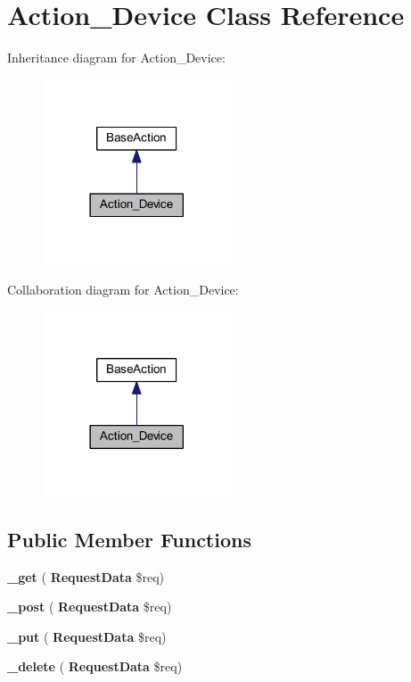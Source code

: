 \section{Action\+\_\+\+Device Class Reference}
\label{class_lora_1_1_api_1_1_action___device}


Inheritance diagram for Action\+\_\+\+Device\+:\nopagebreak
\begin{figure}[H]
\begin{center}
\leavevmode
\includegraphics[width=158pt]{class_lora_1_1_api_1_1_action___device__inherit__graph}
\end{center}
\end{figure}


Collaboration diagram for Action\+\_\+\+Device\+:\nopagebreak
\begin{figure}[H]
\begin{center}
\leavevmode
\includegraphics[width=158pt]{class_lora_1_1_api_1_1_action___device__coll__graph}
\end{center}
\end{figure}
\subsection*{Public Member Functions}
\begin{DoxyCompactItemize}
\item 
\mbox{\label{class_lora_1_1_api_1_1_action___device_a3ad4bf1b146a3180b34d1327ff2abf69}} 
{\bfseries \+\_\+get} (\textbf{ Request\+Data} \$req)
\item 
\mbox{\label{class_lora_1_1_api_1_1_action___device_a50751d47a139282d1c3b08cab1b6562e}} 
{\bfseries \+\_\+post} (\textbf{ Request\+Data} \$req)
\item 
\mbox{\label{class_lora_1_1_api_1_1_action___device_a2affcc8f31c13147c33450193b229194}} 
{\bfseries \+\_\+put} (\textbf{ Request\+Data} \$req)
\item 
\mbox{\label{class_lora_1_1_api_1_1_action___device_ab8ddc6de1e04524212f7d55893f78864}} 
{\bfseries \+\_\+delete} (\textbf{ Request\+Data} \$req)
\end{DoxyCompactItemize}
